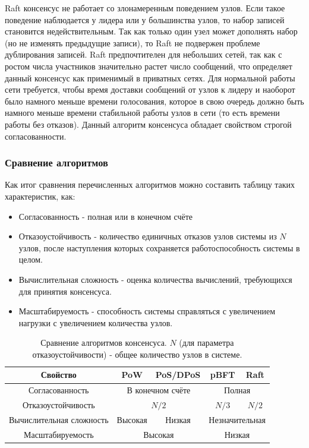 \documentclass[subf, href, colorlinks=true, 14pt,
times, mtpro, specialist]{disser}
\theoremstyle{definition}
\begin{document}
Raft консенсус не работает со злонамеренным поведением узлов. Если такое поведение наблюдается у лидера или у большинства узлов, то набор записей становится недействительным. Так как только один узел может дополнять набор (но не изменять предыдущие записи), то Raft не подвержен проблеме дублирования записей. Raft предпочтителен для небольших сетей, так как с ростом числа участников значительно растет число сообщений, что определяет данный консенсус как применимый в приватных сетях. Для нормальной работы сети требуется, чтобы время доставки сообщений от узлов к лидеру и наоборот было намного меньше времени голосования, которое в свою очередь должно быть намного меньше времени стабильной работы узлов в сети (то есть времени работы без отказов). Данный алгоритм консенсуса обладает свойством строгой согласованности.

\subsubsection{Сравнение алгоритмов}

Как итог сравнения перечисленных алгоритмов можно составить таблицу таких характеристик, как:
\begin{itemize}
\item Согласованность - полная или в конечном счёте
\item Отказоустойчивость - количество единичных отказов узлов системы из $N$ узлов, после наступления которых сохраняется работоспособность системы в целом. 
\item Вычислительная сложность - оценка количества вычислений, требующихся для принятия консенсуса.
\item Масштабируемость - способность системы справляться с увеличением нагрузки с увеличением количества узлов.
\end{itemize}

\begin{table}[H]
\begin{center}
\begin{tabular}{|c|c|c|c|c|}
\hline
Свойство & PoW & PoS/DPoS & pBFT & Raft \\
\hline
Согласованность & \multicolumn{2}{c}{В конечном счёте} & \multicolumn{2}{|c|}{Полная}    \\
\hline
Отказоустойчивость & \multicolumn{2}{c|}{$N/2$} & $N/3$ & $N/2$  \\
\hline
Вычислительная сложность  & Высокая & Низкая & \multicolumn{2}{c|}{Незначительная}  \\
\hline
Масштабируемость & \multicolumn{2}{c|}{Высокая} & \multicolumn{2}{c|}{Низкая}  \\
\hline
\end{tabular}
\end{center}
\caption{Сравнение алгоритмов консенсуса.  $N$ (для параметра отказоустойчивости) - общее количество узлов в системе.}
\end{table} 
\end{document}
